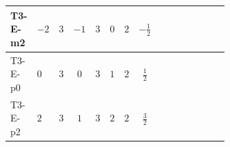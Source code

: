 \documentclass[8pt]{article}
\begin{document}
\begin{landscape}
\begin{longtable}{@{}llcccccc >{\raggedright\arraybackslash}p{0.21\linewidth} >{\raggedright\arraybackslash}p{0.21\linewidth} >{\raggedright\arraybackslash}p{0.21\linewidth}@{}}
\midrule
T3-E-m2 & $-2$ & $3$ & $-1$ & $3$ & $0$ & $2$ & $-\frac{1}{2}$ & \scriptsize\adjustbox{max width=\linewidth}{$\begin{gathered} {\lambda_{HS_2}^{(1)}} (2 T_{\nu}^{(2)}+6 \operatorname{Tr}\!\left({Y_d}\,\left({Y_d}\right)^{\dagger}\right)+2 \operatorname{Tr}\!\left({Y_e}\,\left({Y_e}\right)^{\dagger}\right)+6 \operatorname{Tr}\!\left({Y_u}\,\left({Y_u}\right)^{\dagger}\right)+4 {\lambda_{S_2}^{(A)}})\end{gathered}$} & \scriptsize\adjustbox{max width=\linewidth}{$\begin{gathered} -2 \operatorname{Tr}\!\left({y_2}\,\left({y_2}\right)^{\dagger}\,{Y_e}\,\left({Y_e}\right)^{\dagger}\right)\end{gathered}$} & \scriptsize\adjustbox{max width=\linewidth}{$\begin{gathered} +4 {\lambda_5} \left({\lambda_5}\right)^{*}\end{gathered}$} \\
\midrule
T3-E-p0 & $0$ & $3$ & $0$ & $3$ & $1$ & $2$ & $\frac{1}{2}$ & \scriptsize\adjustbox{max width=\linewidth}{$\begin{gathered} {\lambda_{HS_2}^{(1)}} (2 T_{\nu}^{(2)}+6 \operatorname{Tr}\!\left({Y_d}\,\left({Y_d}\right)^{\dagger}\right)+2 \operatorname{Tr}\!\left({Y_e}\,\left({Y_e}\right)^{\dagger}\right)+6 \operatorname{Tr}\!\left({Y_u}\,\left({Y_u}\right)^{\dagger}\right)+4 {\lambda_{S_2}^{(A)}})\end{gathered}$} & \scriptsize\adjustbox{max width=\linewidth}{$\begin{gathered} -2 \operatorname{Tr}\!\left({y_2}\,\left({y_2}\right)^{\dagger}\,{Y_e}\,\left({Y_e}\right)^{\dagger}\right)\end{gathered}$} & \scriptsize\adjustbox{max width=\linewidth}{$\begin{gathered} +4 {\lambda_5} \left({\lambda_5}\right)^{*}\end{gathered}$} \\
\midrule
T3-E-p2 & $2$ & $3$ & $1$ & $3$ & $2$ & $2$ & $\frac{3}{2}$ & \scriptsize\adjustbox{max width=\linewidth}{$\begin{gathered} {\lambda_{HS_2}^{(1)}} (2 T_{\nu}^{(2)}+6 \operatorname{Tr}\!\left({Y_d}\,\left({Y_d}\right)^{\dagger}\right)+2 \operatorname{Tr}\!\left({Y_e}\,\left({Y_e}\right)^{\dagger}\right)+6 \operatorname{Tr}\!\left({Y_u}\,\left({Y_u}\right)^{\dagger}\right)+4 {\lambda_{S_2}^{(A)}})\end{gathered}$} & \scriptsize\adjustbox{max width=\linewidth}{$\begin{gathered} -2 \operatorname{Tr}\!\left({y_2}\,\left({y_2}\right)^{\dagger}\,{Y_e}\,\left({Y_e}\right)^{\dagger}\right)\end{gathered}$} & \scriptsize\adjustbox{max width=\linewidth}{$\begin{gathered} +4 {\lambda_5} \left({\lambda_5}\right)^{*}\end{gathered}$} \\

\end{longtable}
\end{landscape}
\end{document}
